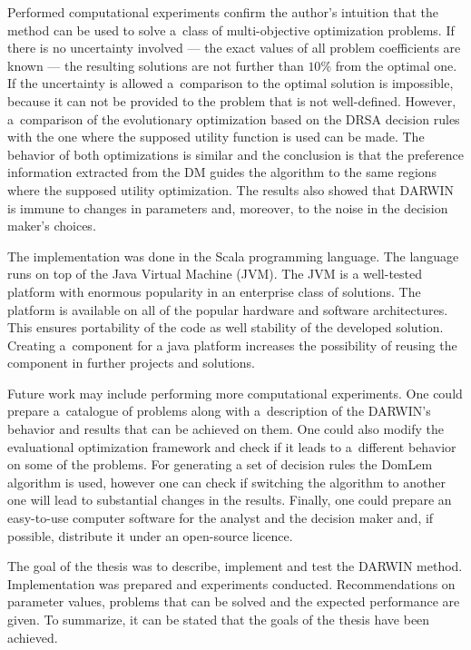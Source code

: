 Performed computational experiments confirm the author's intuition that the
method can be used to solve a~class of multi-objective optimization
problems. If there is no uncertainty involved --- the exact values of all
problem coefficients are known --- the resulting solutions are not further
than $10\%$ from the optimal one. If the uncertainty is allowed a~comparison
to the optimal solution is impossible, because it can not be provided to the
problem that is not well-defined. However, a~comparison of the evolutionary
optimization based on the DRSA decision rules with the one where the supposed
utility function is used can be made. The behavior of both optimizations is
similar and the conclusion is that the preference information extracted from
the DM guides the algorithm to the same regions where the supposed utility
optimization. The results also showed that DARWIN is immune to changes in
parameters and, moreover, to the noise in the decision maker's choices.

The implementation was done in the Scala programming language. The language
runs on top of the Java Virtual Machine (JVM). The JVM is a well-tested
platform with enormous popularity in an enterprise class of solutions. The
platform is available on all of the popular hardware and software
architectures. This ensures portability of the code as well stability of the
developed solution. Creating a~component for a java platform increases the
possibility of reusing the component in further projects and solutions.

Future work may include performing more computational experiments. One could
prepare a~catalogue of problems along with a~description of the DARWIN's
behavior and results that can be achieved on them. One could also modify the
evaluational optimization framework and check if it leads to a~different
behavior on some of the problems. For generating a set of decision rules the
DomLem algorithm is used, however one can check if switching the algorithm to
another one will lead to substantial changes in the results. Finally, one
could prepare an easy-to-use computer software for the analyst and the
decision maker and, if possible, distribute it under an open-source licence.

The goal of the thesis was to describe, implement and test the DARWIN
method. Implementation was prepared and experiments conducted. Recommendations
on parameter values, problems that can be solved and the expected performance
are given. To summarize, it can be stated that the goals of the thesis have
been achieved.

